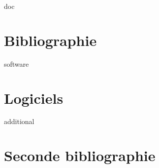 \documentclass[12pt,a4paper]{report}
\begin{document}

\begin{btSect}{doc}
\section*{Bibliographie}
\btPrintCited
\end{btSect}
\label{biblio}


\begin{btSect}{software}
\section*{Logiciels}
\btPrintCited
\end{btSect}
\label{software}


\begin{btSect}{additional}
\section*{Seconde bibliographie}
\btPrintNotCited
\end{btSect}
\label{second_biblio}
\end{document}
